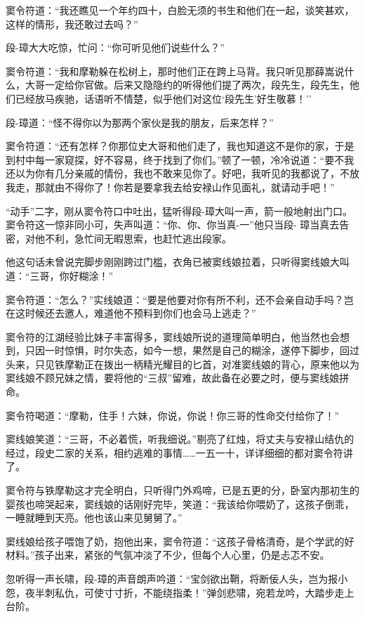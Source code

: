 \documentclass[12pt,oneside]{book}
\begin{document}
窦令符道：``我还瞧见一个年约四十，白脸无须的书生和他们在一起，谈笑甚欢，这样的情形，我还敢过去吗？''

段-璋大大吃惊，忙问：``你可听见他们说些什么？''

窦令符道：``我和摩勒躲在松树上，那时他们正在跨上马背。我只听见那薛嵩说什么，大哥一定给你官做。后来又隐隐约的听得他们提了两次，段先生，段先生，他们已经放马疾驰，话语听不情楚，似乎他们对这位`段先生'好生敬慕！''

段-璋道：``怪不得你以为那两个家伙是我的朋友，后来怎样？''

窦令符道：``还有怎样？你那位史大哥和他们走了，我也知道这不是你的家，于是到村中每一家窥探，好不容易，终于找到了你们。''顿了一顿，冷冷说道：``要不我还以为你有几分亲戚的情份，我也不敢来见你了。好吧，我听见的我都说了，不放我走，那就由不得你了！你若是要拿我去给安禄山作见面礼，就请动手吧！''

``动手''二字，刚从窦令符口中吐出，猛听得段-璋大叫一声，箭一般地射出门口。窦令符这一惊非同小可，失声叫道：``你、你、你当真-一''他只当段-
璋当真去告密，对他不利，急忙间无暇思索，也赶忙逃出段家。

他这句话未曾说完脚步刚刚跨过门槛，衣角已被窦线娘拉着，只听得窦线娘大叫道：``三哥，你好糊涂！''

窦令符道：``怎么？''实线娘道：``要是他要对你有所不利，还不会亲自动手吗？岂在这时候还去邀人，难道他不预料到你们也会马上逃走？''

窦令符的江湖经验比妹子丰富得多，窦线娘所说的道理简单明白，他当然也会想到，只因一时惊惧，时尔失态，如今一想，果然是自己的糊涂，遂停下脚步，回过头来，只见铁摩勒正在拨出一柄精光耀目的匕首，对准窦线娘的背心，原来他以为窦线娘不顾兄妹之情，要将他的``三叔''留难，故此备在必要之时，便与窦线娘拼命。

窦令符喝道：``摩勒，住手！六妹，你说，你说！你三哥的性命交付给你了！''

窦线娘笑道：``三哥，不必着慌，听我细说。''剔亮了红烛，将丈夫与安禄山结仇的经过，段史二家的关系，相约逃难的事情\ldots\ldots 一五一十，详详细细的都对窦令符讲了。

窦令符与铁摩勒这才完全明白，只听得门外鸡啼，已是五更的分，卧室内那初生的婴孩也啼哭起来，窦线娘的话刚好完毕，笑道：``我该给你喂奶了，这孩子倒乖，一睡就睡到天亮。他也该山来见舅舅了。''

窦线娘给孩子喂饱了奶，抱他出来，窦令符道：``这孩子骨格清奇，是个学武的好材料。''孩子出来，紧张的气氛冲淡了不少，但每个人心里，仍是忐忑不安。

忽听得一声长啸，段-璋的声音朗声吟道：``宝剑欲出鞘，将断佞人头，岂为报小怨，夜半刺私仇，可使寸寸折，不能绕指柔！''弹剑悲啸，宛若龙吟，大踏步走上台阶。
\end{document}

